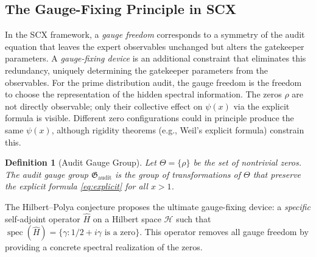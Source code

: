 \documentclass[12pt,a4paper]{article}
\newtheorem{definition}[theorem]{Definition}
\theoremstyle{remark}
\newcommand{\AuditGrp}{\mathfrak{G}_{\text{audit}}}
\newcommand{\Hilb}{\mathcal{H}}
\DeclareMathOperator{\spec}{spec}
\begin{document}
\subsection{The Gauge-Fixing Principle in SCX}
\label{sec:gauge_principle}
In the SCX framework, a \emph{gauge freedom} corresponds to a symmetry of
the audit equation that leaves the expert observables unchanged but alters
the gatekeeper parameters. A \emph{gauge-fixing device} is an additional
constraint that eliminates this redundancy, uniquely determining the
gatekeeper parameters from the observables.
For the prime distribution audit, the gauge freedom is the freedom to
choose the representation of the hidden spectral information. The zeros
$\rho$ are not directly observable; only their collective effect on
$\psi(x)$ via the explicit formula is visible. Different zero
configurations could in principle produce the same $\psi(x)$, although
rigidity theorems (e.g., Weil's explicit formula) constrain this.
\begin{definition}[Audit Gauge Group]
\label{def:gauge_group}
Let $\Theta = \{\rho\}$ be the set of nontrivial zeros. The audit gauge
group $\AuditGrp$ is the group of transformations of $\Theta$ that preserve
the explicit formula \eqref{eq:explicit} for all $x > 1$.
\end{definition}
The Hilbert--Polya conjecture proposes the ultimate gauge-fixing device:
a \emph{specific} self-adjoint operator $\widehat{H}$ on a Hilbert space
$\Hilb$ such that $\spec(\widehat{H}) = \{\gamma : 1/2 + i\gamma \text{ is a
zero}\}$. This operator removes all gauge freedom by providing a concrete
spectral realization of the zeros.
\end{document}
